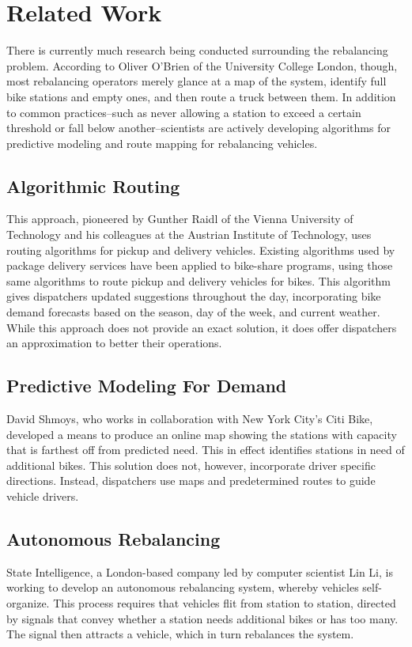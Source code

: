 \documentclass{sig-alternate}
\begin{document}
\section{Related Work}
\label{sec:related_work}
There is currently much research being conducted surrounding the rebalancing problem. According to Oliver O'Brien of the University College London, though, most rebalancing operators merely glance at a map of the system, identify full bike stations and empty ones, and then route a truck between them. In addition to common practices--such as never allowing a station to exceed a certain threshold or fall below another--scientists are actively developing algorithms for predictive modeling and route mapping for rebalancing vehicles.

\subsection{Algorithmic Routing}
This approach, pioneered by Gunther Raidl of the Vienna University of Technology and his colleagues at the Austrian Institute of Technology, uses routing algorithms for pickup and delivery vehicles. Existing algorithms used by package delivery services have been applied to bike-share programs, using those same algorithms to route pickup and delivery vehicles for bikes. This algorithm gives dispatchers updated suggestions throughout the day, incorporating bike demand forecasts based on the season, day of the week, and current weather. While this approach does not provide an exact solution, it does offer dispatchers an approximation to better their operations.

\subsection{Predictive Modeling For Demand}
David Shmoys, who works in collaboration with New York City's Citi Bike, developed a means to produce an online map showing the stations with capacity that is farthest off from predicted need. This in effect identifies stations in need of additional bikes. This solution does not, however, incorporate driver specific directions. Instead, dispatchers use maps and predetermined routes to guide vehicle drivers.

\subsection{Autonomous Rebalancing}
State Intelligence, a London-based company led by computer scientist Lin Li, is working to develop an autonomous rebalancing system, whereby vehicles self-organize. This process requires that vehicles flit from station to station, directed by signals that convey whether a station needs additional bikes or has too many. The signal then attracts a vehicle, which in turn rebalances the system.
\end{document}
